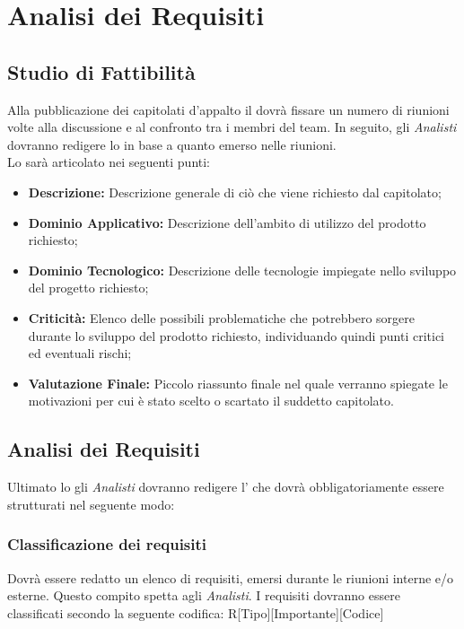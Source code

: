 \section{Analisi dei Requisiti}
\subsection{Studio di Fattibilità}
Alla pubblicazione dei capitolati d'appalto il \textsl{\RdP} dovrà fissare un 
numero di riunioni volte alla discussione e al confronto tra i membri del team. 
In seguito, gli \textsl{Analisti} dovranno redigere lo \textsl{\SdF} in base a quanto 
emerso nelle riunioni.\\
Lo \textsl{\SdF} sarà articolato nei seguenti punti:
\begin{itemize}
  \item \textbf{Descrizione:} Descrizione generale di ciò che viene richiesto 
  dal capitolato;
  \item \textbf{Dominio Applicativo:} Descrizione dell'ambito di utilizzo del 
  prodotto richiesto;
  \item \textbf{Dominio Tecnologico:} Descrizione delle tecnologie impiegate 
  nello sviluppo del progetto richiesto;
  \item \textbf{Criticità:} Elenco delle possibili problematiche che potrebbero 
  sorgere durante lo sviluppo del prodotto richiesto, individuando quindi punti 
  critici ed eventuali rischi;
  \item \textbf{Valutazione Finale:} Piccolo riassunto finale nel quale verranno 
  spiegate le motivazioni per cui è stato scelto o scartato il suddetto 
  capitolato.
\end{itemize}

\subsection{Analisi dei Requisiti}
Ultimato lo \textsl{\SdF} gli \textsl{Analisti} dovranno redigere l'\textsl{\AdR} 
che dovrà obbligatoriamente essere strutturati nel seguente modo:

\subsubsection{Classificazione dei requisiti}
Dovrà essere redatto un elenco di requisiti, emersi durante le riunioni interne 
e/o esterne. Questo compito spetta agli \textsl{Analisti}. I requisiti dovranno 
essere classificati secondo la seguente codifica:
R[Tipo][Importante][Codice]

